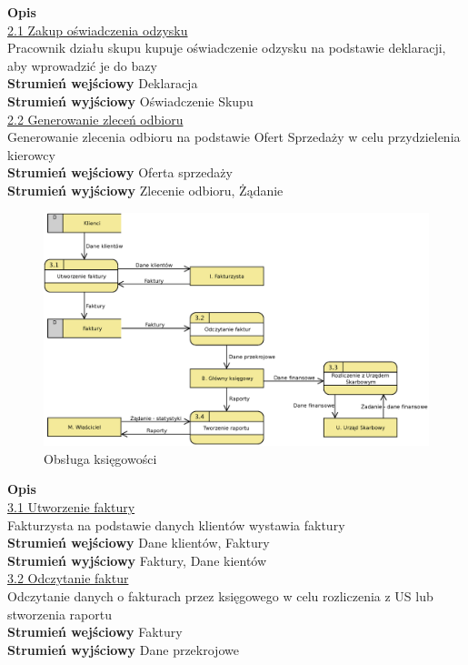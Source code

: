 	\textbf{Opis} \\
	\underline{2.1 Zakup oświadczenia odzysku}\\
	Pracownik działu skupu kupuje oświadczenie odzysku na podstawie deklaracji, aby wprowadzić je do bazy \\
	\textbf{Strumień wejściowy} Deklaracja \\
	\textbf{Strumień wyjściowy} Oświadczenie Skupu \\
	
	\underline{2.2 Generowanie zleceń odbioru}\\
	Generowanie zlecenia odbioru na podstawie Ofert Sprzedaży w celu przydzielenia kierowcy \\
	\textbf{Strumień wejściowy} Oferta sprzedaży \\
	\textbf{Strumień wyjściowy} Zlecenie odbioru, Żądanie \\
	
	\begin{figure}[H]
		\centering
		\centerline{\includegraphics[width=1.1\textwidth]{img/DFD/2-level-ksiegowosc.eps}}
		\caption{Obsługa księgowości}
	\end{figure}

	\textbf{Opis} \\
	\underline{3.1 Utworzenie faktury}\\
	Fakturzysta na podstawie danych klientów wystawia faktury \\
	\textbf{Strumień wejściowy} Dane klientów, Faktury \\
	\textbf{Strumień wyjściowy} Faktury, Dane kientów \\
	
	\underline{3.2 Odczytanie faktur}\\
	Odczytanie danych o fakturach przez księgowego w celu rozliczenia z US lub stworzenia raportu \\
	\textbf{Strumień wejściowy} Faktury\\
	\textbf{Strumień wyjściowy} Dane przekrojowe \\

